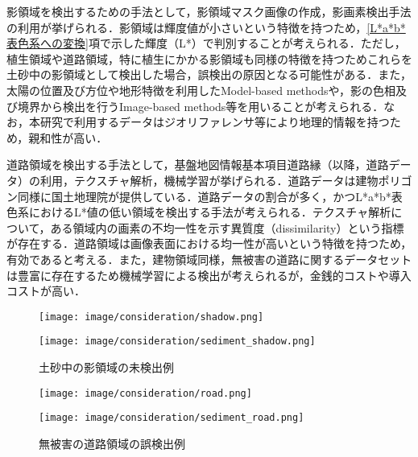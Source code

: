       影領域を検出するための手法として，影領域マスク画像の作成，影画素検出手法の利用が挙げられる．影領域は輝度値が小さいという特徴を持つため，\ref{L*a*b*表色系への変換}項で示した輝度（L*）で判別することが考えられる．ただし，植生領域や道路領域，特に植生にかかる影領域も同様の特徴を持つためこれらを土砂中の影領域として検出した場合，誤検出の原因となる可能性がある．また，太陽の位置及び方位や地形特徴を利用したModel-based methodsや，影の色相及び境界から検出を行うImage-based methods等を用いることが考えられる．なお，本研究で利用するデータはジオリファレンサ等により地理的情報を持つため，親和性が高い\cite{影領域検出}．

      道路領域を検出する手法として，基盤地図情報基本項目道路縁（以降，道路データ）の利用，テクスチャ解析，機械学習が挙げられる．道路データは建物ポリゴン同様に国土地理院が提供している．道路データの割合が多く，かつL*a*b*表色系におけるL*値の低い領域を検出する手法が考えられる．テクスチャ解析について，ある領域内の画素の不均一性を示す異質度（dissimilarity）という指標が存在する\cite{異質度}．道路領域は画像表面における均一性が高いという特徴を持つため，有効であると考える．また，建物領域同様，無被害の道路に関するデータセットは豊富に存在するため機械学習による検出が考えられるが，金銭的コストや導入コストが高い．

      \begin{figure}[tbp]
        \begin{minipage}[c]{0.5\hsize}
          \centering
          \texttt{[image: image/consideration/shadow.png]}
        \end{minipage}
        \begin{minipage}[c]{0.5\hsize}
          \centering
          \texttt{[image: image/consideration/sediment\_shadow.png]}
        \end{minipage}
        \caption{土砂中の影領域の未検出例}
        \label{影領域}
      \end{figure}
      
      \begin{figure}[tbp]
        \begin{minipage}[c]{0.5\hsize}
          \centering
          \texttt{[image: image/consideration/road.png]}
        \end{minipage}
        \begin{minipage}[c]{0.5\hsize}
          \centering
          \texttt{[image: image/consideration/sediment\_road.png]}
        \end{minipage}
        \caption{無被害の道路領域の誤検出例}
        \label{道路領域}
      \end{figure}


